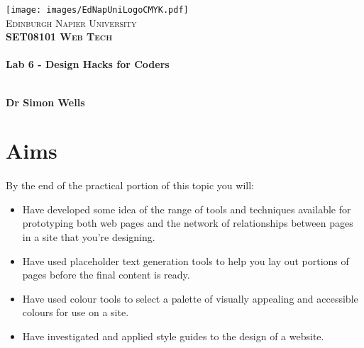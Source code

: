 \documentclass[10pt, a4paper]{article}
\begin{document}

\begin{titlepage}
\vspace*{5cm}
\begin{center}
\texttt{[image: images/EdNapUniLogoCMYK.pdf]}~\\[1cm]

\textsc{\Large Edinburgh Napier University}\\[1.5cm]

\textsc{\LARGE \bfseries SET08101 Web Tech}\\[0.5cm]

\hrulefill \\[0.4cm]
{\huge \bfseries Lab 6 - Design Hacks for Coders \\[0.4cm] }
\hrulefill \\[1.5cm]

\begin{minipage}{0.4\textwidth}
\begin{flushleft} \large
\textbf{Dr Simon Wells} \\
\end{flushleft}
\end{minipage}

\vfill

\end{center}
\end{titlepage}




%

\section{Aims}
\paragraph{} By the end of the practical portion of this topic you will:

\begin{itemize}
\item Have developed some idea of the range of tools and techniques available for prototyping both web pages and the network of relationships between pages in a site that you're designing.
\item Have used placeholder text generation tools to help you lay out portions of pages before the final content is ready.
\item Have used colour tools to select a palette of visually appealing and accessible colours for use on a site.
\item Have investigated and applied style guides to the design of a website.
\end{itemize}
\end{document}
